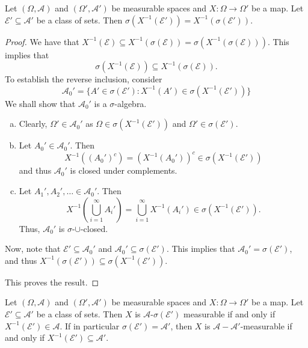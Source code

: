 \begin{theorem}
\label{generating pi system fixed under preimage}
    Let $(\Omega,\mathcal{A})$ and $(\Omega',\mathcal{A}')$ be measurable spaces and $X:\Omega\to\Omega'$ be a map.
    Let $\mathcal{E}'\subseteq\mathcal{A}'$ be a class of sets. Then $\sigma(X^{-1}(\mathcal{E}'))=X^{-1}(\sigma(\mathcal{E}'))$.
\end{theorem}
\begin{proof}
    We have that $X^{-1}(\mathcal{E})\subseteq X^{-1}(\sigma(\mathcal{E}))=\sigma(X^{-1}(\sigma(\mathcal{E})))$. This implies that
    $$\sigma(X^{-1}(\mathcal{E}))\subseteq X^{-1}(\sigma(\mathcal{E})).$$
    To establish the reverse inclusion, consider
    $$\mathcal{A}_0'=\{A'\in\sigma(\mathcal{E}'):X^{-1}(A')\in\sigma(X^{-1}(\mathcal{E}'))\}$$
    We shall show that $\mathcal{A}_0'$ is a $\sigma$-algebra.
    \begin{enumerate}[(a)]
        \item Clearly, $\Omega'\in\mathcal{A}_0'$ as $\Omega\in\sigma(X^{-1}(\mathcal{E}'))$ and $\Omega'\in\sigma(\mathcal{E}')$.
        
        \item Let $A_0'\in\mathcal{A}_0'$. Then
        $$X^{-1}((A_0')^c) = (X^{-1}(A_0'))^c \in \sigma(X^{-1}(\mathcal{E}'))$$
        and thus $\mathcal{A_0}'$ is closed under complements.
        
        \item Let $A_1',A_2',\ldots\in\mathcal{A}_0'$. Then
        $$X^{-1}\left(\bigcup_{i=1}^\infty A_i'\right) = \bigcup_{i=1}^\infty X^{-1}\left(A_i'\right)\in \sigma(X^{-1}(\mathcal{E}')).$$
        Thus, $\mathcal{A}_0'$ is $\sigma$-$\cup$-closed.
    \end{enumerate}
    
    Now, note that $\mathcal{E}'\subseteq\mathcal{A}_0'$ and $\mathcal{A}_0'\subseteq\sigma(\mathcal{E}')$. This implies that $\mathcal{A}_0'=\sigma(\mathcal{E}')$, and thus $X^{-1}(\sigma(\mathcal{E}'))\subseteq\sigma(X^{-1}(\mathcal{E}'))$.
    
    This proves the result.
\end{proof}

\begin{corollary}
    Let $(\Omega,\mathcal{A})$ and $(\Omega',\mathcal{A}')$ be measurable spaces and $X:\Omega\to\Omega'$ be a map. Let $\mathcal{E}'\subseteq\mathcal{A}'$ be a class of sets. Then $X$ is $\mathcal{A}$-$\sigma(\mathcal{E}')$ measurable if and only if $X^{-1}(\mathcal{E}')\in\mathcal{A}$. If in particular $\sigma(\mathcal{E}')=\mathcal{A}'$, then $X$ is $\mathcal{A}-\mathcal{A}'$-measurable if and only if $X^{-1}(\mathcal{E}')\subseteq\mathcal{A}'$.
\end{corollary}

